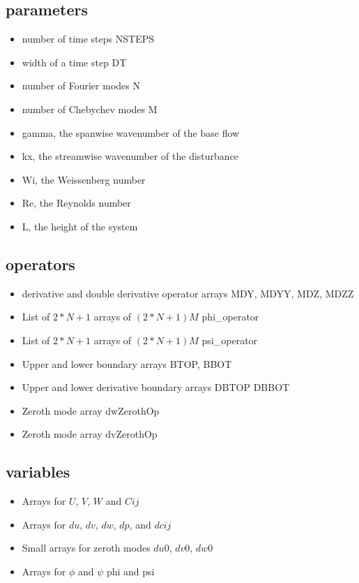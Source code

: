 \documentclass[12pt,a4paper]{article}
\begin{document}
\subsection{parameters}

\begin{itemize}
    \item number of time steps NSTEPS
    \item width of a time step DT
    \item number of Fourier modes N
    \item number of Chebychev modes M
    \item gamma, the spanwise wavenumber of the base flow
    \item kx, the streamwise wavenumber of the disturbance
    \item Wi, the Weissenberg number 
    \item Re, the Reynolds number
    \item L, the height of the system
\end{itemize}

\subsection{operators}

\begin{itemize}
    \item derivative and double derivative operator arrays MDY, MDYY, MDZ, MDZZ 
    \item List of $2*N+1$ arrays of $(2*N+1)M$ phi\_operator
    \item List of $2*N+1$ arrays of $(2*N+1)M$ psi\_operator
    \item Upper and lower boundary arrays BTOP, BBOT
    \item Upper and lower derivative boundary arrays DBTOP DBBOT
    \item Zeroth mode array dwZerothOp
    \item Zeroth mode array dvZerothOp
\end{itemize}

\subsection{variables}

\begin{itemize}
    \item Arrays for $U$, $V$, $W$ and $Cij$
    \item Arrays for $du$, $dv$, $dw$, $dp$, and $dcij$
    \item Small arrays for zeroth modes $du0$, $dv0$, $dw0$
    \item Arrays for $\phi$ and $\psi$ phi and psi
\end{itemize}

\end{document}
